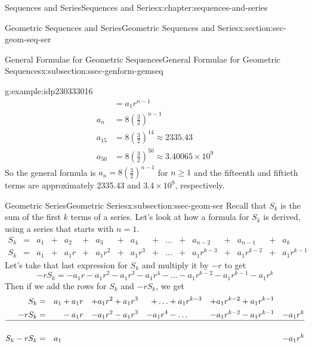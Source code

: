 \documentclass[twoside,10pt,]{book}
\numberwithin{equation}{section}
\newcommand{\amp}{&}
\begin{document}
\begin{chapterptx}{Sequences and Series}{}{Sequences and Series}{}{}{x:chapter:sequences-and-series}
\begin{sectionptx}{Geometric Sequences and Series}{}{Geometric Sequences and Series}{}{}{x:section:sec-geom-seq-ser}
\begin{subsectionptx}{General Formulae for Geometric Sequences}{}{General Formulae for Geometric Sequences}{}{}{x:subsection:ssec-genform-gemseq}
\begin{example}{}{g:example:idp230333016}
\begin{align*}
\amp = a_1 r^{n-1}\\
a_n \amp = 8\left(\frac{3}{2}\right)^{n-1}\\
a_{15}\amp = 8\left(\frac{3}{2}\right)^{14}\approx 2335.43\\
a_{50}\amp = 8\left(\frac{3}{2}\right)^{50}\approx 3.40065\times 10^9
\end{align*}
So the general formula is \(a_n = 8\left( \frac{3}{2} \right)^{n - 1}\) for \(n \ge 1\) and the fifteenth and fiftieth terms are approximately 2335.43 and \(3.4 \times 10^9\), respectively.\end{example}
%
\end{subsectionptx}
%
%
\typeout{************************************************}
\typeout{************************************************}
%
\begin{subsectionptx}{Geometric Series}{}{Geometric Series}{}{}{x:subsection:ssec-geom-ser}
Recall that \(S_k\) is the sum of the first \(k\) terms of a series.  Let's look at how a formula for \(S_k\) is derived, using a series that starts with \(n=1\).%
\begin{align*}
S_k \amp = \amp{a_1} \amp+ \amp{a_2} \amp+ \amp{a_3} \amp+ \amp{a_4} \amp+ \amp\ldots \amp+ \amp{a_{n - 2}} \amp+ \amp{a_{n - 1}} \amp+ \amp{a_k}\\
S_k \amp = \amp{a_1} \amp+ \amp{a_1}r \amp+ \amp{a_1}{r^2} \amp+ \amp{a_1}{r^3} \amp+ \amp\ldots \amp+ \amp{a_1}{r^{k - 3}} \amp+ \amp{a_1}{r^{k - 2}} \amp+ \amp{a_1}{r^{k - 1}}
\end{align*}
Let's take that last expression for \(S_k\) and multiply it by \(-r\) to get%
\begin{equation*}
- r{S_k} =  - {a_1}r - {a_1}{r^2} - {a_1}{r^3} - {a_1}{r^4} - ... - {a_1}{r^{k - 2}} - {a_1}{r^{k - 1}} - {a_1}{r^k}
\end{equation*}
Then if we add the rows for \(S_k\) and \(-rS_k\), we get%
\begin{align*}
{S_k} \amp= \amp {a_1} \amp+ {a_1}r \amp+ {a_1}{r^2} \amp+ {a_1}{r^3} \amp+ \ldots \amp+ {a_1}{r^{k - 3}} \amp+ {a_1}{r^{k - 2}} \amp+ {a_1}{r^{k - 1}}\\
- r{S_k} \amp=\amp\amp  - {a_1}r \amp- {a_1}{r^2} \amp- {a_1}{r^3} \amp- {a_1}{r^4} \amp- \ldots \amp- {a_1}{r^{k - 2}} \amp- {a_1}{r^{k - 1}} \amp- {a_1}{r^k}\\
\hline\\
{S_k} - r{S_k} \amp=\amp {a_1} \amp\amp\amp\amp\amp\amp\amp\amp- {a_1}{r^k}
\end{align*}

\end{subsectionptx}
\end{sectionptx}
\end{chapterptx}
\end{document}
